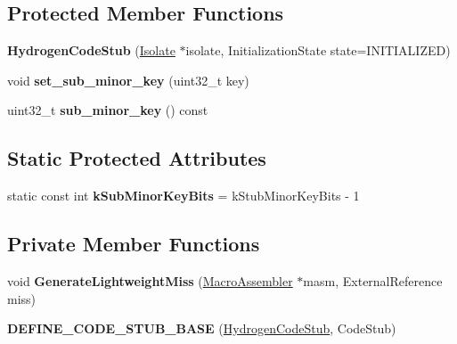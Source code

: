\subsection*{Protected Member Functions}
\begin{DoxyCompactItemize}
\item 
{\bfseries Hydrogen\+Code\+Stub} (\hyperlink{classv8_1_1internal_1_1_isolate}{Isolate} $\ast$isolate, Initialization\+State state=I\+N\+I\+T\+I\+A\+L\+I\+Z\+ED)\hypertarget{classv8_1_1internal_1_1_hydrogen_code_stub_a7866dc5b5599a7898b5d1ee2d924e557}{}\label{classv8_1_1internal_1_1_hydrogen_code_stub_a7866dc5b5599a7898b5d1ee2d924e557}

\item 
void {\bfseries set\+\_\+sub\+\_\+minor\+\_\+key} (uint32\+\_\+t key)\hypertarget{classv8_1_1internal_1_1_hydrogen_code_stub_a9be8812afea356978fdb25866b98450e}{}\label{classv8_1_1internal_1_1_hydrogen_code_stub_a9be8812afea356978fdb25866b98450e}

\item 
uint32\+\_\+t {\bfseries sub\+\_\+minor\+\_\+key} () const \hypertarget{classv8_1_1internal_1_1_hydrogen_code_stub_a77c38ca3b7cb672cc5739fc40633eba1}{}\label{classv8_1_1internal_1_1_hydrogen_code_stub_a77c38ca3b7cb672cc5739fc40633eba1}

\end{DoxyCompactItemize}
\subsection*{Static Protected Attributes}
\begin{DoxyCompactItemize}
\item 
static const int {\bfseries k\+Sub\+Minor\+Key\+Bits} = k\+Stub\+Minor\+Key\+Bits -\/ 1\hypertarget{classv8_1_1internal_1_1_hydrogen_code_stub_ad87313471a8277d78f5a562eb6f66fa0}{}\label{classv8_1_1internal_1_1_hydrogen_code_stub_ad87313471a8277d78f5a562eb6f66fa0}

\end{DoxyCompactItemize}
\subsection*{Private Member Functions}
\begin{DoxyCompactItemize}
\item 
void {\bfseries Generate\+Lightweight\+Miss} (\hyperlink{classv8_1_1internal_1_1_macro_assembler}{Macro\+Assembler} $\ast$masm, External\+Reference miss)\hypertarget{classv8_1_1internal_1_1_hydrogen_code_stub_a78f8c9bbc82278d1af7859c1f6db202f}{}\label{classv8_1_1internal_1_1_hydrogen_code_stub_a78f8c9bbc82278d1af7859c1f6db202f}

\item 
{\bfseries D\+E\+F\+I\+N\+E\+\_\+\+C\+O\+D\+E\+\_\+\+S\+T\+U\+B\+\_\+\+B\+A\+SE} (\hyperlink{classv8_1_1internal_1_1_hydrogen_code_stub}{Hydrogen\+Code\+Stub}, Code\+Stub)\hypertarget{classv8_1_1internal_1_1_hydrogen_code_stub_ab168b21a3ddc95cfd61c504c5299de1e}{}\label{classv8_1_1internal_1_1_hydrogen_code_stub_ab168b21a3ddc95cfd61c504c5299de1e}

\end{DoxyCompactItemize}


